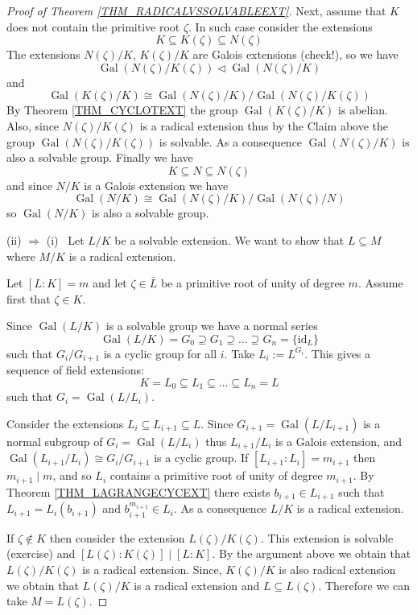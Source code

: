 \documentclass[12pt, letterpaper, oneside]{article}
\theoremstyle{plain}
\theoremstyle{definition}
\newcommand{\id}{\mathrm{id}}
\newcommand{\Gal}{\operatorname{Gal}}
\newcommand{\vs}{\vskip 5mm}
\begin{document}
\begin{proof}[Proof of Theorem \ref{THM_RADICALVSSOLVABLEEXT}]
Next, assume that  $K$ does not contain the primitive root $\zeta$. In such case consider 
the extensions
$$K\subseteq K(\zeta) \subseteq N(\zeta)$$
The extensions  $N(\zeta)/K$, $K(\zeta)/K$ are Galois extensions (check!), so we have 
$$\Gal(N(\zeta)/K(\zeta)) \lhd \Gal(N(\zeta)/K)$$ 
and 
$$\Gal(K(\zeta)/K) \cong \Gal(N(\zeta)/K)/\Gal(N(\zeta)/K(\zeta))$$
By Theorem \ref{THM_CYCLOTEXT} the group $\Gal(K(\zeta)/K)$ is abelian. Also, 
since $N(\zeta)/K(\zeta)$ is a radical extension thus by the Claim above the group 
$\Gal(N(\zeta)/K(\zeta))$ is solvable. As a consequence 
$\Gal(N(\zeta)/K)$ is also a solvable group. Finally we have 
$$K\subseteq N\subseteq N(\zeta)$$
and since $N/K$ is a Galois extension we have 
$$\Gal(N/K)\cong \Gal(N(\zeta)/K)/\Gal(N(\zeta)/N)$$
so $\Gal(N/K)$ is also a solvable group. 


\vs\vs


(ii) $\Rightarrow$ (i) \ Let $L/K$ be a solvable extension. We want to show that 
$L\subseteq M$ where $M/K$ is a radical extension. 

Let $[L:K] = m$ and let $\zeta\in \bar{L}$ be a primitive root of unity  of degree $m$. 
Assume first that $\zeta\in K$. 


Since $\Gal(L/K)$ is a solvable group we have a normal series 
$$\Gal(L/K) = G_{0} \supseteq G_{1} \supseteq {\dots} \supseteq G_{n} = \{\id_{L}\}$$
such that $G_{i}/G_{i+1}$ is a cyclic group for all $i$. Take $L_{i}:= L^{G_{i}}$. 
This gives a sequence of field extensions:
$$K= L_{0} \subseteq L_{1} \subseteq {\dots} \subseteq L_{n} = L$$
such that $G_{i} = \Gal(L/L_{i})$. 

Consider the extensions $L_{i}\subseteq L_{i+1}\subseteq L$. 
Since $G_{i+1}= \Gal(L/L_{i+1})$ is a normal subgroup of $G_{i} = \Gal(L/L_{i})$ thus 
$L_{i+1}/L_{i}$ is a Galois extension, and $\Gal(L_{i+1}/L_{i})\cong G_{i}/G_{i+1}$
is a cyclic group. If $[L_{i+1}:L_{i}] = m_{i+1}$ then $m_{i+1}\mid m$, and so $L_{i}$ contains 
a primitive root of unity of degree $m_{i+1}$. By  Theorem \ref{THM_LAGRANGECYCEXT}  
there exists $b_{i+1}\in L_{i+1}$ such that $L_{i+1} = L_{i}(b_{i+1})$ and 
$b_{i+1}^{m_{i+1}}\in L_{i}$. As a consequence $L/K$ is a radical extension. 


If $\zeta\not\in K$ then consider the extension $L(\zeta)/K(\zeta)$. This extension
is solvable (exercise) and $[L(\zeta): K(\zeta)] \mid [L:K]$.  By the argument above 
we obtain that $L(\zeta)/K(\zeta)$ is a radical extension. Since, $K(\zeta)/K$ is also 
radical extension we obtain that $L(\zeta)/K$ is a radical extension and $L\subseteq L(\zeta)$. 
Therefore we can take $M= L(\zeta)$. 

\end{proof}
\end{document}
